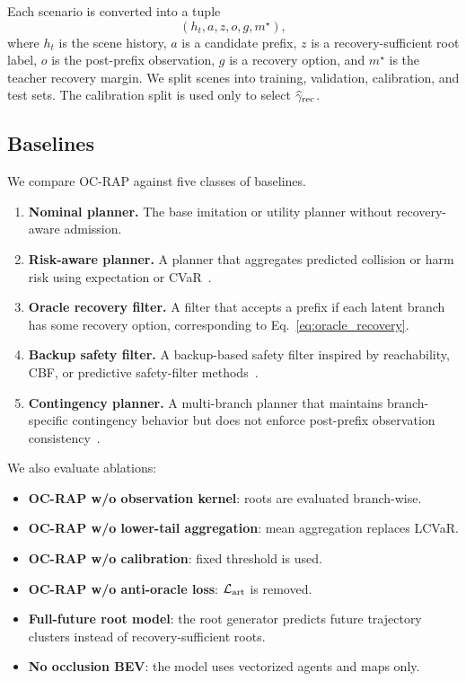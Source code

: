\documentclass[conference]{IEEEtran}
\begin{document}
Each scenario is converted into a tuple
\[
    (h_t,a,z,o,g,m^\star),
\]
where $h_t$ is the scene history, $a$ is a candidate prefix, $z$ is a recovery-sufficient root label, $o$ is the post-prefix observation, $g$ is a recovery option, and $m^\star$ is the teacher recovery margin.  We split scenes into training, validation, calibration, and test sets.  The calibration split is used only to select $\widehat\gamma_{\rm rec}$.

\subsection{Baselines}
\label{subsec:baselines}

We compare OC-RAP against five classes of baselines.

\begin{enumerate}[leftmargin=*]
    \item \textbf{Nominal planner.} The base imitation or utility planner without recovery-aware admission.
    \item \textbf{Risk-aware planner.} A planner that aggregates predicted collision or harm risk using expectation or CVaR~\cite{uryasev2000conditional,hakobyan2021wasserstein,safaoui2024distributionally}.
    \item \textbf{Oracle recovery filter.} A filter that accepts a prefix if each latent branch has some recovery option, corresponding to Eq.~\eqref{eq:oracle_recovery}.
    \item \textbf{Backup safety filter.} A backup-based safety filter inspired by reachability, CBF, or predictive safety-filter methods~\cite{bansal2017hamilton,bansal2021deepreach,ames2019control,wabersich2021predictive,tearle2021predictive}.
    \item \textbf{Contingency planner.} A multi-branch planner that maintains branch-specific contingency behavior but does not enforce post-prefix observation consistency~\cite{li2023marc,mustafa2024racp}.
\end{enumerate}

We also evaluate ablations:
\begin{itemize}[leftmargin=*]
    \item \textbf{OC-RAP w/o observation kernel}: roots are evaluated branch-wise.
    \item \textbf{OC-RAP w/o lower-tail aggregation}: mean aggregation replaces LCVaR.
    \item \textbf{OC-RAP w/o calibration}: fixed threshold is used.
    \item \textbf{OC-RAP w/o anti-oracle loss}: $\mathcal{L}_{\rm art}$ is removed.
    \item \textbf{Full-future root model}: the root generator predicts future trajectory clusters instead of recovery-sufficient roots.
    \item \textbf{No occlusion BEV}: the model uses vectorized agents and maps only.
\end{itemize}
\end{document}
